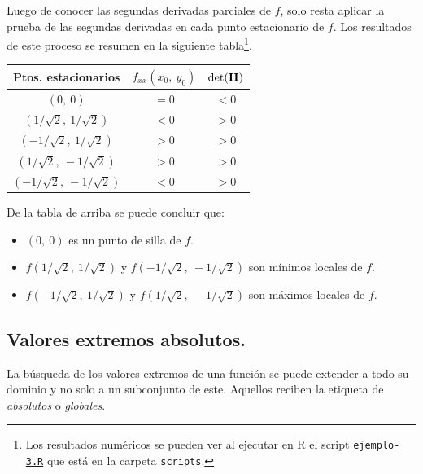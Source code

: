 \documentclass[12pt]{article}
\begin{document}
Luego de conocer las segundas derivadas parciales de $f$, solo resta aplicar la prueba de las segundas derivadas en cada punto estacionario de $f$. Los resultados de este proceso se resumen en la siguiente tabla\footnote{Los resultados numéricos se pueden ver al ejecutar en R el script \texttt{\href{run:scripts/ejemplo-3.R}{ejemplo-3.R}} que está en la carpeta \texttt{scripts}.}.

\begin{table}[hbt!]
\centering
\renewcommand{\arraystretch}{1.5}

\begin{tabular}{c c c}
\hline
      Ptos. estacionarios      & $f_{xx}(x_{0}, \ y_{0})$ & $\det(\mathbf{H})$ \\
\hline
         $(0, \ 0)$            &              $= 0$       &        $< 0$       \\
$(1/\sqrt{2}, \ 1/\sqrt{2})$   &              $< 0$       &        $> 0$       \\
$(-1/\sqrt{2}, \ 1/\sqrt{2})$  &              $> 0$       &        $> 0$       \\
$(1/\sqrt{2}, \ -1/\sqrt{2})$  &              $> 0$       &        $> 0$       \\
$(-1/\sqrt{2}, \ -1/\sqrt{2})$ &              $< 0$       &        $> 0$       \\
\hline
\end{tabular}

\end{table}

De la tabla de arriba se puede concluir que:

\begin{itemize}
\item $(0, \ 0)$ es un punto de silla de $f$.
\item $f(1/\sqrt{2}, \ 1/\sqrt{2})$ y $f(-1/\sqrt{2}, \ -1/\sqrt{2})$ son mínimos locales de $f$.
\item $f(-1/\sqrt{2}, \ 1/\sqrt{2})$ y $f(1/\sqrt{2}, \ -1/\sqrt{2})$ son máximos locales de $f$.
\end{itemize}

\subsection{Valores extremos absolutos.}

La búsqueda de los valores extremos de una función se puede extender a todo su dominio y no solo a un subconjunto de este. Aquellos reciben la etiqueta de \textit{absolutos} o \textit{globales}.
\end{document}
